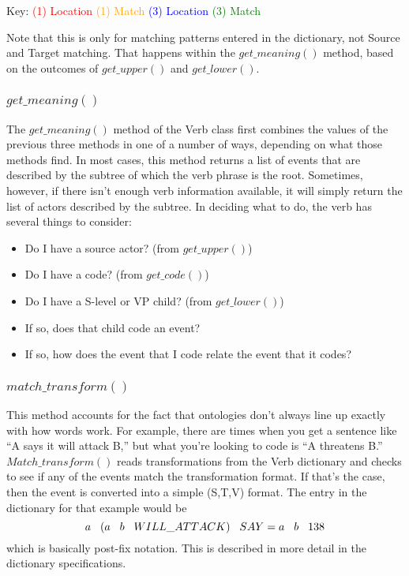 \documentclass[11pt]{article}
\begin{document}
Key: \textcolor{red}{(1) Location} \textcolor{orange}{(1) Match} 
\textcolor{blue}{(3) Location} \textcolor{green}{(3) Match}

Note that this is only for matching patterns entered in the dictionary, not Source and Target matching. 
That happens within the $get\_meaning()$ method, based on the outcomes of $get\_upper()$ 
and $get\_lower()$.
\subsubsection{$get\_meaning()$}
The $get\_meaning()$ method of the Verb class first combines the values of the 
previous three methods in one of a number of ways, depending on what those 
methods find. In most cases, this method returns a list of events that are described by the 
subtree of which the verb phrase is the root. Sometimes, however, if there isn't 
enough verb information available, it will simply return the list of actors described by 
the subtree. In deciding what to do, the verb has several things to consider: 
\begin{itemize}
\item Do I have a source actor? (from $get\_upper()$)
\item Do I have a code? (from $get\_code()$)
\item Do I have a S-level or VP child? (from $get\_lower()$)
\item If so, does that child code an event?
\item If so, how does the event that I code relate the event that it codes?
\end{itemize}

\subsubsection{$match\_transform()$}
This method accounts for the fact that ontologies don't always 
line up exactly with how words work. For example, there are times when you get 
a sentence like ``A says it will attack B,'' but what you're looking to code is ``A threatens B.''
 $Match\_transform()$ reads transformations from the Verb dictionary and checks 
 to see if any of the events match the transformation format. If that's the 
 case, then the event is converted into a simple (S,T,V) format. The entry in 
 the dictionary for that example would be $$ a  \hspace{3mm}(a \hspace{3mm} b \hspace{3mm} WILL\_ATTACK)\hspace{3mm} SAY = a\hspace{3mm} b\hspace{3mm} 138 $$ 
 which is basically post-fix notation. This is described in more detail in the dictionary 
 specifications.
 
\end{document}
